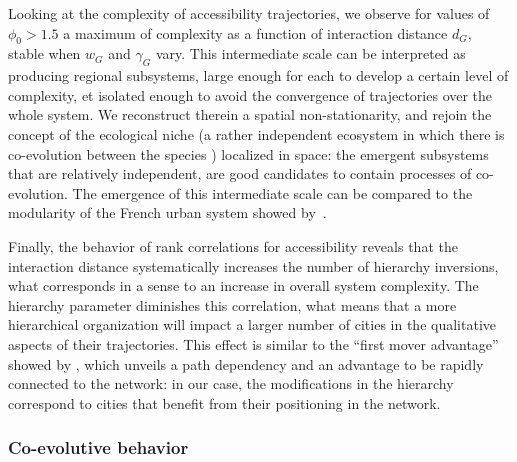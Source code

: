 Looking at the complexity of accessibility trajectories, we observe for values of $\phi_0 > 1.5$ a maximum of complexity as a function of interaction distance $d_G$, stable when $w_G$ and $\gamma_G$ vary. This intermediate scale can be interpreted as producing regional subsystems, large enough for each to develop a certain level of complexity, et isolated enough to avoid the convergence of trajectories over the whole system. We reconstruct therein a spatial non-stationarity, and rejoin the concept of the ecological niche (a rather independent ecosystem in which there is co-evolution between the species \citep{holland2012signals}) localized in space: the emergent subsystems that are relatively independent, are good candidates to contain processes of co-evolution. The emergence of this intermediate scale can be compared to the modularity of the French urban system showed by~\cite{berroir2017systemes}.



Finally, the behavior of rank correlations for accessibility reveals that the interaction distance systematically increases the number of hierarchy inversions, what corresponds in a sense to an increase in overall system complexity. The hierarchy parameter diminishes this correlation, what means that a more hierarchical organization will impact a larger number of cities in the qualitative aspects of their trajectories. This effect is similar to the ``first mover advantage'' showed by \cite{levinson2011does}, which unveils a path dependency and an advantage to be rapidly connected to the network: in our case, the modifications in the hierarchy correspond to cities that benefit from their positioning in the network.



\subsubsection{Co-evolutive behavior}



